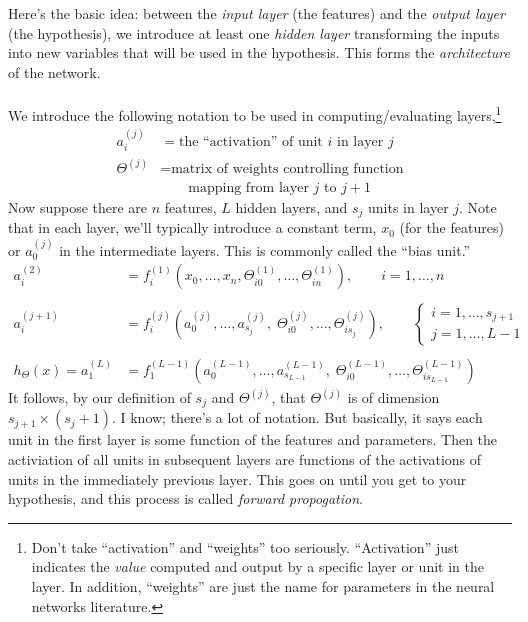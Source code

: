 \documentclass[12pt]{article}
\begin{document}
Here's the basic idea:
between the \emph{input layer} (the features) and the
\emph{output layer} (the hypothesis), we introduce at least one
\emph{hidden layer} transforming the inputs into new variables
that will be used in the hypothesis. This forms the
\emph{architecture} of the network.
\\
\\
We introduce the following notation to be used in computing/evaluating
layers,\footnote{
Don't take ``activation'' and ``weights'' too seriously.  ``Activation''
just indicates the \emph{value} computed and output by a specific
layer or unit in the layer. In addition, ``weights'' are just
the name for parameters in the neural networks literature.}
\begin{align*}
   a^{(j)}_i &= \text{the ``activation'' of unit $i$ in layer $j$} \\
   \Theta^{(j)} &= \text{matrix of weights controlling function}\\
   &\qquad \text{mapping from layer $j$ to $j+1$}
\end{align*}
Now suppose there are $n$ features, $L$ hidden layers, and $s_j$
units in layer $j$. Note that in each layer, we'll typically introduce
a constant term, $x_0$ (for the features) or $a^{(j)}_0$ in
the intermediate layers. This is commonly called the ``bias unit.''
\begin{align*}
   a^{(2)}_i &= f^{(1)}_i\left(x_0, \ldots, x_n,
      \Theta_{i0}^{(1)},\ldots,\Theta_{in}^{(1)}\right), \qquad
      i=1,\ldots,n
   \\	\\
   a^{(j+1)}_i &= f^{(j)}_i\left(a_0^{(j)}, \ldots,
      a_{s_j}^{(j)}, \;
      \Theta_{i0}^{(j)},\ldots,\Theta_{is_j}^{(j)}\right), \qquad
      \begin{cases}
	 i=1,\ldots,s_{j+1} \\  j = 1, \ldots, L-1 \end{cases}
      \\
      \\
   h_\Theta(x) =
      a^{(L)}_1 &= f^{(L-1)}_1\left(a_0^{(L-1)},
      \ldots,
      a_{s_{L-1}}^{(L-1)}, \;
      \Theta_{i0}^{(L-1)},\ldots,\Theta_{is_{L-1}}^{(L-1)}
      \right)
\end{align*}
It follows, by our definition of $s_j$ and $\Theta^{(j)}$, that
$\Theta^{(j)}$ is of dimension $s_{j+1} \times (s_j + 1)$.
I know; there's a lot of notation. But basically, it says each unit
in the first layer is some function of the features and parameters.
Then the activiation of all units in subsequent layers are functions of
the activations of units in the immediately previous layer. This
goes on until you get to your hypothesis, and this process is called
\emph{forward propogation}.
\end{document}

